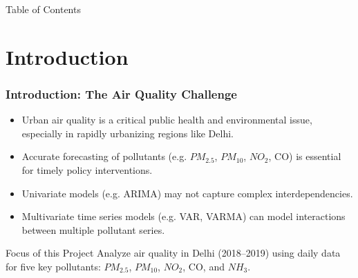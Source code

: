 \documentclass[svgnames, 12pt]{beamer}
\begin{document}
\begin{frame}{Table of Contents}
\tableofcontents
\end{frame}

\section{Introduction}
\begin{frame}
    \frametitle{Introduction: The Air Quality Challenge}
    \begin{itemize}
        \item Urban air quality is a critical public health and environmental issue, especially in rapidly urbanizing regions like Delhi.
        \item Accurate forecasting of pollutants (e.g. $PM_{2.5}$, $PM_{10}$, $NO_2$, CO) is essential for timely policy interventions.
        \item Univariate models (e.g. ARIMA) may not capture complex interdependencies.
        \item Multivariate time series models (e.g. VAR, VARMA) can model interactions between multiple pollutant series.
    \end{itemize}
    \vspace{0.5cm}
    \begin{block}{Focus of this Project}
        Analyze air quality in Delhi (2018--2019) using daily data for five key pollutants: $PM_{2.5}$, $PM_{10}$, $NO_2$, CO, and $NH_3$.
    \end{block}
\end{frame}
\end{document}
